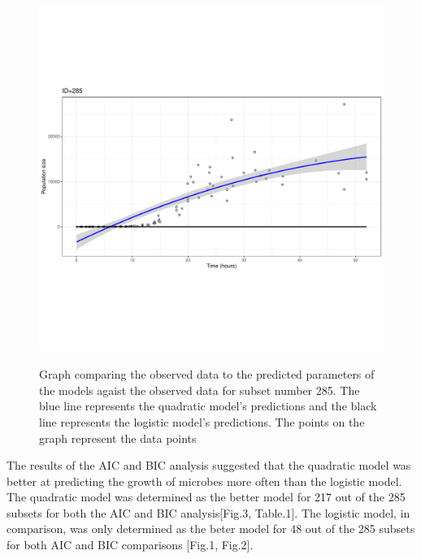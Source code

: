\documentclass{article}[11pt]
\begin{document}
\begin{flushleft}
\begin{figure}[h]
	\includegraphics[width=12cm,height=12cm,keepaspectratio]{plot285.pdf}
	\centering
	\caption{Graph comparing the observed data to the predicted parameters of the models agaist the observed data for subset number 285. The blue line represents the quadratic model's predictions and the black line represents the logistic model's predictions. The points on the graph represent the data points}
\end{figure}

The results of the AIC and BIC analysis suggested that the quadratic model was better at predicting the growth of microbes more often than the logistic model. The quadratic model was determined as the better model for 217 out of the 285 subsets for both the AIC and BIC analysis[Fig.3, Table.1]. The logistic model, in comparison, was only determined as the beter model for 48 out of the 285 subsets for both AIC and BIC comparisons [Fig.1, Fig.2].
\linebreak


\end{flushleft}
\end{document}
